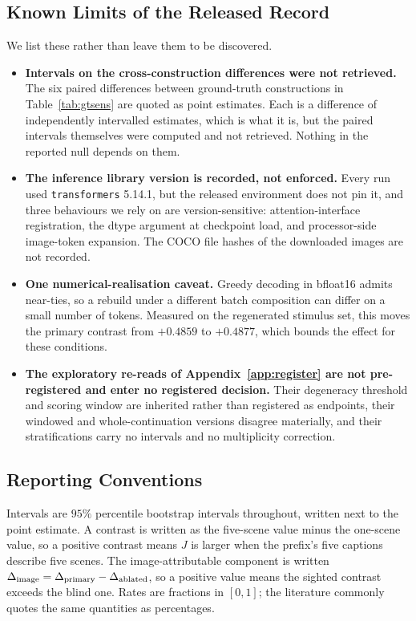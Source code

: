 \subsection{Known Limits of the Released Record}
\label{app:repro-limits}

We list these rather than leave them to be discovered.

\begin{itemize}
\itemsep0em
\item \textbf{Intervals on the cross-construction differences were not retrieved.} The six paired
differences between ground-truth constructions in Table~\ref{tab:gtsens} are quoted as point
estimates. Each is a difference of independently intervalled estimates, which is what it is, but the
paired intervals themselves were computed and not retrieved. Nothing in the reported null depends on
them.
\item \textbf{The inference library version is recorded, not enforced.} Every run used
\texttt{transformers} 5.14.1, but the released environment does not pin it, and three behaviours we
rely on are version-sensitive: attention-interface registration, the dtype argument at checkpoint load, and
processor-side image-token expansion. The COCO file hashes of the downloaded images are not recorded.
\item \textbf{One numerical-realisation caveat.} Greedy decoding in bfloat16 admits near-ties, so a
rebuild under a different batch composition can differ on a small number of tokens. Measured on the
regenerated stimulus set, this moves the primary contrast from $+0.4859$ to $+0.4877$, which bounds
the effect for these conditions.
\item \textbf{The exploratory re-reads of Appendix~\ref{app:register} are not pre-registered and enter
no registered decision.} Their degeneracy threshold and scoring window are inherited rather than registered
as endpoints, their windowed and whole-continuation versions disagree materially, and their
stratifications carry no intervals and no multiplicity correction.
\end{itemize}

\subsection{Reporting Conventions}

Intervals are $95\%$ percentile bootstrap intervals throughout, written 
next to the point estimate. A contrast is written as the five-scene value minus the one-scene value,
so a positive contrast means $J$ is larger when the prefix's five captions describe five scenes.
The image-attributable component is written $\Delta_{\mathrm{image}} = \Delta_{\mathrm{primary}} - \Delta_{\mathrm{ablated}}$, so a positive value means
the sighted contrast exceeds the blind one. Rates are fractions in $[0,1]$; the literature commonly
quotes the same quantities as percentages.


